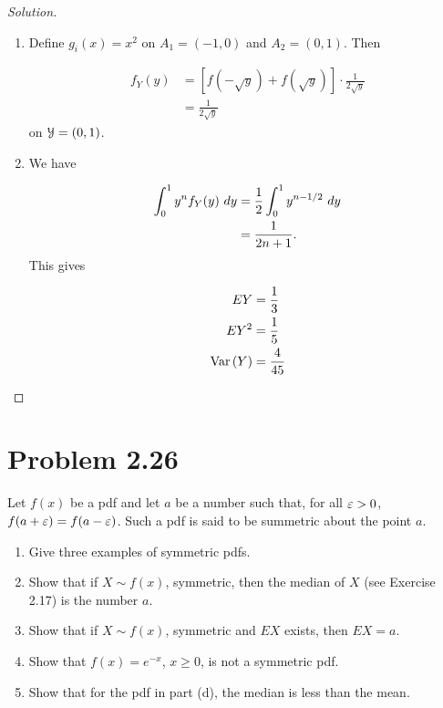 \documentclass[12pt,letterpaper,reqno]{amsart}
\numberwithin{equation}{subsection}
\begin{document}
\begin{proof}[Solution]~\\
\begin{enumerate}[label=(\alph*),leftmargin=*]
    \item Define $g_i(x) = x^2$ on $A_1 = (-1,0)$ and $A_2 = (0,1)$. Then
    
    \begin{align*}
        f_Y(y) &= \left[ f(-\sqrt{y}) + f(\sqrt{y}) \right] \cdot \frac{1}{2\sqrt{y}} \\
        &= \frac{1}{2\sqrt{y}}
    \end{align*}
    on $\mycal{Y} = (0,1)$.
    
    \item We have
    
    \begin{align*}
        \myint{y^n f_Y(y)}{y}{0}{1} &= \frac{1}{2} \myint{y^{n-1/2}}{y}{0}{1} \\
        &= \frac{1}{2n+1}.
    \end{align*}
    This gives
    
    \begin{align*}
        EY &= \frac{1}{3} \\
        EY^2 &= \frac{1}{5} \\
        \Var{Y} &= \frac{4}{45}
    \end{align*}
\end{enumerate}
\end{proof}

\newpage
\section{Problem 2.26}

Let $f(x)$ be a pdf and let $a$ be a number such that, for all $\ve > 0$, $f(a + \ve) = f(a - \ve)$. Such a pdf is said to be summetric about the point $a$.

\begin{enumerate}[label=(\alph*),leftmargin=*]
    \item Give three examples of symmetric pdfs.
    \item Show that if $X \sim f(x)$, symmetric, then the median of $X$ (see Exercise 2.17) is the number $a$.
    \item Show that if $X \sim f(x)$, symmetric and $EX$ exists, then $EX = a$.
    \item Show that $f(x) = e^{-x}$, $x \geq 0$, is not a symmetric pdf.
    \item Show that for the pdf in part (d), the median is less than the mean.
\end{enumerate}~\\
\end{document}
